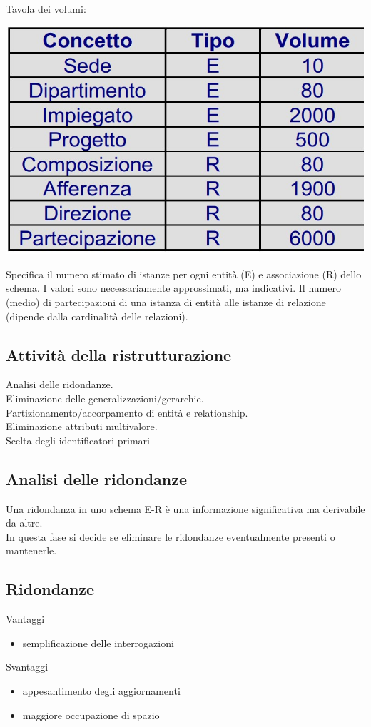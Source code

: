 Tavola dei volumi:
\begin{center}
    \includegraphics[scale=0.675]{chaptersLezioniSara/img/PLog_tavolaAccessi_es3c.jpg}
\end{center}
Specifica il numero stimato di istanze per ogni entità (E) e associazione (R) dello schema. I valori sono necessariamente approssimati, ma indicativi. Il numero (medio) di partecipazioni di una istanza di entità alle istanze di relazione (dipende dalla cardinalità delle relazioni).

\subsection{Attività della ristrutturazione}
Analisi delle ridondanze.\\
Eliminazione delle generalizzazioni/gerarchie.\\
Partizionamento/accorpamento di entità e relationship.\\
Eliminazione attributi multivalore.\\
Scelta degli identificatori primari

\subsection{Analisi delle ridondanze}
Una ridondanza in uno schema E-R è una informazione significativa ma derivabile da altre.\\
In questa fase si decide se eliminare le ridondanze eventualmente presenti o mantenerle.

\subsection{Ridondanze}
Vantaggi
\begin{itemize}
    \item semplificazione delle interrogazioni
\end{itemize}
Svantaggi
\begin{itemize}
    \item appesantimento degli aggiornamenti
    \item maggiore occupazione di spazio
\end{itemize}

